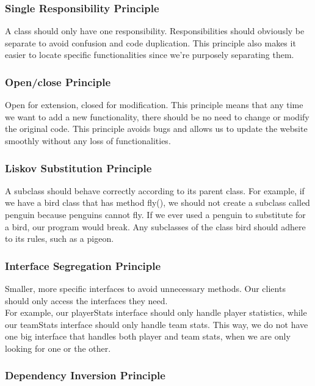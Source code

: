 \documentclass{article}
\begin{document}
\subsubsection*{Single Responsibility Principle}

A class should only have one responsibility. Responsibilities should obviously be separate to avoid confusion and code duplication. This principle also makes it easier to locate specific functionalities since we're purposely separating them.

\subsubsection*{Open/close Principle}

Open for extension, closed for modification. This principle means that any time we want to add a new functionality, there should be no need to change or modify the original code. This principle avoids bugs and allows us to update the website smoothly without any loss of functionalities.

\subsubsection*{Liskov Substitution Principle}

A subclass should behave correctly according to its parent class. For example, if we have a bird class that has method fly(), we should not create a subclass called penguin because penguins cannot fly. If we ever used a penguin to substitute for a bird, our program would break. Any subclasses of the class bird should adhere to its rules, such as a pigeon.

\subsubsection*{Interface Segregation Principle}

Smaller, more specific interfaces to avoid unnecessary methods. Our clients should only access the interfaces they need. \\

\noindent For example, our playerStats interface should only handle player statistics, while our teamStats interface should only handle team stats. This way, we do not have one big interface that handles both player and team stats, when we are only looking for one or the other.


\subsubsection*{Dependency Inversion Principle}
\end{document}
